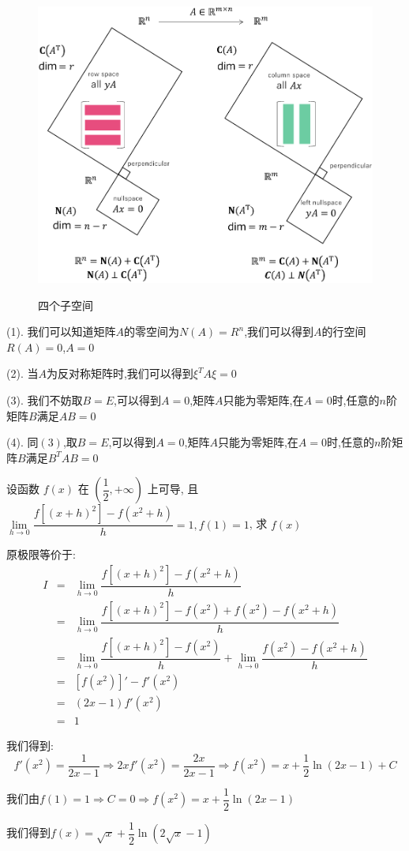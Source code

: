 \begin{figure}[ht]
	\centering
	\includegraphics[width=13cm,height=10cm]{"figure/Question/四个子空间.pdf"}
	\caption{四个子空间}
\end{figure} 
\begin{solution}

	(1). 我们可以知道矩阵$A$的零空间为$N(A)=R^{n}$,我们可以得到$A$的行空间$R(A)=0$,$A=0$
	
	(2). 当$A$为反对称矩阵时,我们可以得到$\xi^{T}A\xi=0$
	
	(3). 我们不妨取$B=E$,可以得到$A=0$,矩阵$A$只能为零矩阵,在$A=0$时,任意的$n$阶矩阵$B$满足$AB=0$
	
	(4). 同$(3)$,取$B=E$,可以得到$A=0$,矩阵$A$只能为零矩阵,在$A=0$时,任意的$n$阶矩阵$B$满足$B^{T}AB=0$
\end{solution}

\begin{example}[][Exam: 34.2.2]
	设函数 $f(x)$ 在 $(\dfrac{1}{2},+\infty)$ 上可导, 且 $\lim\limits_{h\to 0}\dfrac{f[(x+h)^2]-f(x^2+h)}{h}=1, f(1)=1$, 求 $f(x)$
\end{example}

\begin{solution}

	原极限等价于:  
	\begin{eqnarray*}
		I&=&\lim\limits_{h\to 0}\dfrac{f[(x+h)^2]-f(x^2+h)}{h}\\
		&=&\lim\limits_{h\to 0}\dfrac{f[(x+h)^2]-f(x^2)+f(x^2)-f(x^2+h)}{h}\\
		&=&\lim\limits_{h\to 0}\dfrac{f[(x+h)^2]-f(x^2)}{h}+\lim\limits_{h\to 0}\dfrac{f(x^2)-f(x^2+h)}{h}\\
		&=&[f(x^2)]'-f'(x^2)\\
		&=&(2x-1)f'(x^2)\\
		&=&1
	\end{eqnarray*}

	我们得到:  
	$$f'(x^2)=\dfrac{1}{2x-1}\Rightarrow 2xf'(x^2)=\dfrac{2x}{2x-1}\Rightarrow f(x^2)=x+\dfrac{1}{2}\ln(2x-1)+C$$
	
	我们由$f(1)=1\Rightarrow C=0\Rightarrow f(x^2)=x+\dfrac{1}{2}\ln(2x-1)$
	
	我们得到$f(x)=\sqrt{x}+\dfrac{1}{2}\ln(2\sqrt{x}-1)$
\end{solution}


